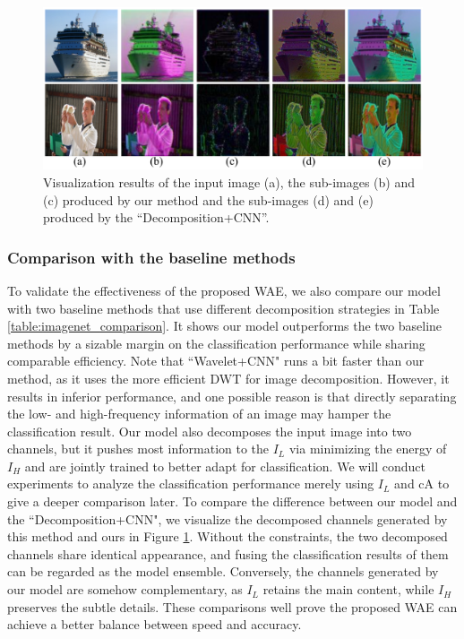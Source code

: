 \documentclass[letterpaper]{article} %
\begin{document}
\begin{figure}[htbp]
   \centering
   \includegraphics[width=0.90\linewidth]{visualization_comparison.pdf}
   \caption{Visualization results of the input image (a), the sub-images (b) and (c) produced by our method and the sub-images (d) and (e) produced by the ``Decomposition+CNN''.}
   \label{fig:visualization_comparison}
\end{figure}

\subsubsection{Comparison with the baseline methods}
To validate the effectiveness of the proposed WAE, we also compare our model with two baseline methods that use different decomposition strategies in Table \ref{table:imagenet_comparison}. It shows our model outperforms the two baseline methods by a sizable margin on the classification performance while sharing comparable efficiency. Note that ``Wavelet+CNN" runs a bit faster than our method, as it uses the more efficient DWT for image decomposition. However, it results in inferior performance, and one possible reason is that directly separating the low- and high-frequency information of an image may hamper the classification result. Our model also decomposes the input image into two channels, but it pushes most information to the $I_L$ via minimizing the energy of $I_H$ and are jointly trained to better adapt for classification. We will conduct experiments to analyze the classification performance merely using $I_L$ and cA to give a deeper comparison later. To compare the difference between our model and the ``Decomposition+CNN", we visualize the decomposed channels generated by this method and ours in Figure \ref{fig:visualization_comparison}. Without the constraints, the two decomposed channels share identical appearance, and fusing the classification results of them can be regarded as the model ensemble. Conversely, the channels generated by our model are somehow complementary, as $I_L$ retains the main content, while $I_H$ preserves the subtle details. These comparisons well prove the proposed WAE can achieve a better balance between speed and accuracy.
\end{document}
